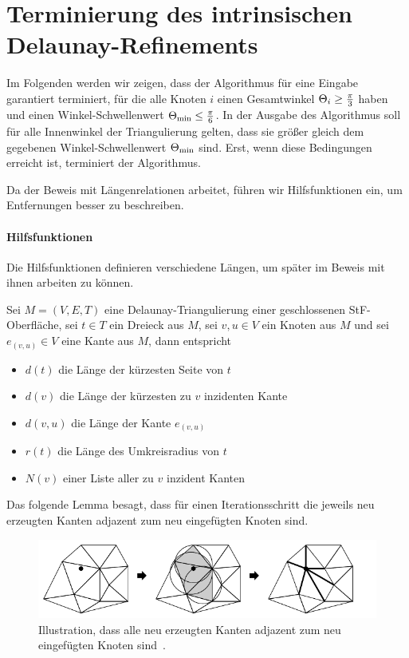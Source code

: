 \chapter{ Terminierung des intrinsischen Delaunay-Refinements}
\label{kap:Terminierung}

Im Folgenden werden wir zeigen, dass der Algorithmus für eine Eingabe garantiert terminiert, für die alle Knoten $i$ einen Gesamtwinkel $\gesamtwinkel*\geq \frac{\pi}{3}$ haben und einen Winkel-Schwellenwert $\kleinsterWinkel* \leq \frac{\pi}{6}$. In der Ausgabe des Algorithmus soll für alle Innenwinkel der Triangulierung gelten, dass sie größer gleich dem gegebenen Winkel-Schwellenwert $\kleinsterWinkel*$ sind. Erst, wenn diese Bedingungen erreicht ist, terminiert der Algorithmus.


Da der Beweis mit  Längenrelationen arbeitet, führen wir Hilfsfunktionen ein, um Entfernungen besser zu beschreiben. 

\subsubsection{Hilfsfunktionen}
Die Hilfsfunktionen definieren verschiedene Längen, um später im Beweis mit ihnen arbeiten zu können.
\begin{definition}
Sei $M = (V,E,T)$ eine Delaunay-Triangulierung  einer geschlossenen StF-Oberfläche, sei $t \in T$ ein Dreieck aus $M$, sei $v,u \in V$ ein Knoten aus $M$ und sei $e_{(v,u)} \in V$ eine Kante aus $M$,  dann entspricht
\begin{itemize}
    \item $d(t)$ die Länge der kürzesten Seite von $t$
    \item $d(v)$ die Länge der kürzesten zu $v$ inzidenten Kante
    \item $d(v,u)$ die Länge der Kante  $e_{(v,u)}$
    \item $r(t)$ die Länge des Umkreisradius von $t$
    \item $N(v)$ einer Liste aller zu $v$ inzident Kanten
\end{itemize}


\end{definition}



Das folgende Lemma besagt, dass für einen Iterationsschritt die jeweils neu erzeugten Kanten adjazent zum neu eingefügten Knoten sind.


\begin{figure}[h!]
    \centering
    \includegraphics[width=5in]{images/adejazent.png}
    \caption{Illustration, dass alle neu erzeugten Kanten adjazent zum neu eingefügten Knoten sind~\cite{shewchuk:1997:delaunay}. }%
    \label{fig:adejazent}
\end{figure}
 


